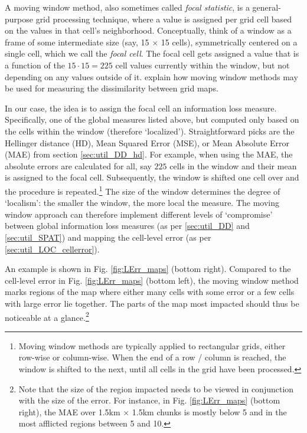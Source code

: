 A moving window method, also sometimes called \emph{focal statistic}, is a general-purpose grid processing technique, where a value is assigned per grid cell based on the values in that cell's neighborhood. Conceptually, think of a window as a frame of some intermediate size (say, 15 $\times$ 15 cells), symmetrically centered on a single cell, which we call the \emph{focal cell}. The focal cell gets assigned a value that is a function of the $15 \cdot 15 = 225$ cell values currently within the window, but not depending on any values outside of it. \citet{KuhnertEtAl2005} explain how moving window methods may be used for measuring the dissimilarity between grid maps.

In our case, the idea is to assign the focal cell an information loss measure. Specifically, one of the global measures listed above, but computed only based on the cells within the window (therefore `localized'). Straightforward picks are the Hellinger distance (HD), Mean Squared Error (MSE), or Mean Absolute Error (MAE) from section \ref{sec:util_DD_hd}. For example, when using the MAE, the absolute errors are calculated for all, say $225$ cells in the window and their mean is assigned to the focal cell. Subsequently, the window is shifted one cell over and the procedure is repeated.\footnote{
    Moving window methods are typically applied to rectangular grids, either row-wise or column-wise. When the end of a row / column is reached, the window is shifted to the next, until all cells in the grid have been processed.}
The size of the window determines the degree of `localism': the smaller the window, the more local the measure. The moving window approach can therefore implement different levels of `compromise' between global information loss measures (as per \ref{sec:util_DD} and \ref{sec:util_SPAT}) and mapping the cell-level error (as per \ref{sec:util_LOC_cellerror}).

An example is shown in Fig. \ref{fig:LErr_maps} (bottom right). Compared to the cell-level error in Fig. \ref{fig:LErr_maps} (bottom left), the moving window method marks regions of the map where either many cells with some error or a few cells with large error lie together. The parts of the map most impacted should thus be noticeable at a glance.\footnote{
    Note that the size of the region impacted needs to be viewed in conjunction with the size of the error. For instance, in Fig. \ref{fig:LErr_maps} (bottom right), the MAE over 1.5km $\times$ 1.5km chunks is mostly below 5 and in the most afflicted regions %
    between 5 and 10.}

